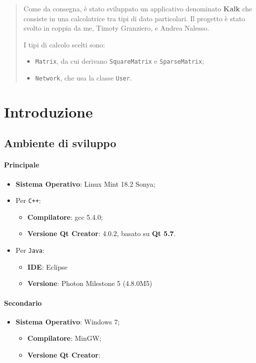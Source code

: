 \begin{abstract} 
    Come da consegna, è stato sviluppato un applicativo denominato \textbf{Kalk} che consiste 
    in una calcolatrice tra tipi di dato particolari. Il progetto è stato svolto in coppia da me,
    Timoty Granziero, e Andrea Nalesso. \par
    I tipi di calcolo scelti sono:
    \begin{itemize}
        \item \texttt{Matrix}, da cui derivano \texttt{SquareMatrix}
        e \texttt{SparseMatrix};
        \item \texttt{Network}, che usa la classe \texttt{User}.
    \end{itemize}
\end{abstract}

\section{Introduzione}

\subsection{Ambiente di sviluppo}
\paragraph*{Principale}
\begin{itemize}
    \item \textbf{Sistema Operativo}: Linux Mint 18.2 Sonya;
    \item Per \texttt{C++}:
    \begin{itemize}
        \item \textbf{Compilatore}: gcc 5.4.0;
        \item \textbf{Versione Qt Creator}: 4.0.2, basato su \textbf{Qt 5.7}.            
    \end{itemize}
    \item Per \texttt{Java}:
    \begin{itemize}
        \item \textbf{IDE}: Eclipse 
        \item \textbf{Versione}: Photon Milestone 5 (4.8.0M5)
    \end{itemize}
\end{itemize}

\paragraph*{Secondario}
\begin{itemize}
    \item \textbf{Sistema Operativo}: Windows 7;
    \begin{itemize}
        \item \textbf{Compilatore}: MinGW;
        \item \textbf{Versione Qt Creator}:            
    \end{itemize}
\end{itemize}

